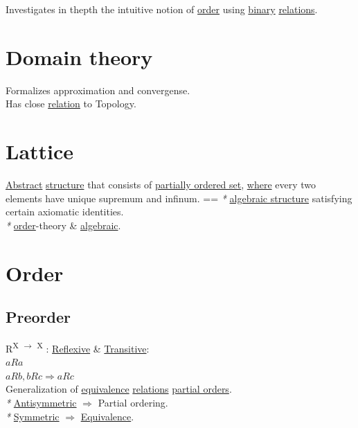 \documentclass[a4paper,14pt,oneside]{book}
\begin{document}
{Investigates in thepth the intuitive notion of \hyperref[orgb3255b0]{order} using \hyperref[orge428263]{binary} \hyperref[org7713e01]{relations}.\\

\section{\label{orgbc36a80}Domain theory}
\label{sec:org6bdf7a2}

Formalizes approximation and convergense.\\
Has close \hyperref[orgc61e9ed]{relation} to Topology.\\

\section{\label{orgfe85755}Lattice}
\label{sec:org2364273}

\hyperref[org3affb7d]{Abstract} \hyperref[org080800e]{structure} that consists of \hyperref[orge61ce13]{partially ordered set}, \hyperref[org5b6b021]{where} every two elements have unique supremum and infinum. == \emph{*} \hyperref[org57a3d22]{algebraic structure} satisfying certain axiomatic identities.\\
\emph{*} \hyperref[orgb3255b0]{order}-theory \& \hyperref[org312c3a4]{algebraic}.\\

\section{\label{orgb3255b0}Order}
\label{sec:org20c24e5}

\subsection{\label{org8ac4a9a}Preorder}
\label{sec:org9cd1286}

R\textsuperscript{X \(\to\) X} : \hyperref[orgabc6f82]{Reflexive} \& \hyperref[orgf56af6a]{Transitive}:\\
\(aRa\)\\
\(aRb, bRc \Rightarrow aRc\)\\

Generalization of \hyperref[orgea1116b]{equivalence} \hyperref[org7713e01]{relations} \hyperref[org2d8ea70]{partial orders}.\\

\emph{*} \hyperref[org632830b]{Antisymmetric} \(\Rightarrow\) Partial ordering.\\
\emph{*} \hyperref[org809cc6c]{Symmetric} \(\Rightarrow\) \hyperref[orgea1116b]{Equivalence}.\\

}
\end{document}
